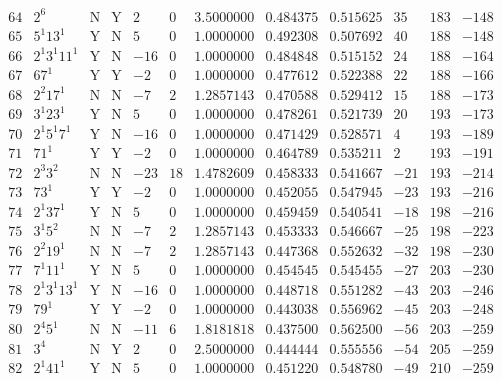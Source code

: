 \documentclass[11pt,reqno,a4letter]{article}
\numberwithin{figure}{section}
\numberwithin{table}{section}
\theoremstyle{plain}
\numberwithin{theorem}{section}
\theoremstyle{definition}
\begin{document}
\begin{table}[h!]
\begin{equation*}
{\begin{array}{cc|cc|ccc|cc|ccc}
 64 & 2^6 & \text{N} & \text{Y} & 2 & 0 & 3.5000000 & 0.484375 & 0.515625 & 35 & 183 & -148 \\
 65 & 5^1 13^1 & \text{Y} & \text{N} & 5 & 0 & 1.0000000 & 0.492308 & 0.507692 & 40 & 188 & -148 \\
 66 & 2^1 3^1 11^1 & \text{Y} & \text{N} & -16 & 0 & 1.0000000 & 0.484848 & 0.515152 & 24 & 188 & -164 \\
 67 & 67^1 & \text{Y} & \text{Y} & -2 & 0 & 1.0000000 & 0.477612 & 0.522388 & 22 & 188 & -166 \\
 68 & 2^2 17^1 & \text{N} & \text{N} & -7 & 2 & 1.2857143 & 0.470588 & 0.529412 & 15 & 188 & -173 \\
 69 & 3^1 23^1 & \text{Y} & \text{N} & 5 & 0 & 1.0000000 & 0.478261 & 0.521739 & 20 & 193 & -173 \\
 70 & 2^1 5^1 7^1 & \text{Y} & \text{N} & -16 & 0 & 1.0000000 & 0.471429 & 0.528571 & 4 & 193 & -189 \\
 71 & 71^1 & \text{Y} & \text{Y} & -2 & 0 & 1.0000000 & 0.464789 & 0.535211 & 2 & 193 & -191 \\
 72 & 2^3 3^2 & \text{N} & \text{N} & -23 & 18 & 1.4782609 & 0.458333 & 0.541667 & -21 & 193 & -214 \\
 73 & 73^1 & \text{Y} & \text{Y} & -2 & 0 & 1.0000000 & 0.452055 & 0.547945 & -23 & 193 & -216 \\
 74 & 2^1 37^1 & \text{Y} & \text{N} & 5 & 0 & 1.0000000 & 0.459459 & 0.540541 & -18 & 198 & -216 \\
 75 & 3^1 5^2 & \text{N} & \text{N} & -7 & 2 & 1.2857143 & 0.453333 & 0.546667 & -25 & 198 & -223 \\
 76 & 2^2 19^1 & \text{N} & \text{N} & -7 & 2 & 1.2857143 & 0.447368 & 0.552632 & -32 & 198 & -230 \\
 77 & 7^1 11^1 & \text{Y} & \text{N} & 5 & 0 & 1.0000000 & 0.454545 & 0.545455 & -27 & 203 & -230 \\
 78 & 2^1 3^1 13^1 & \text{Y} & \text{N} & -16 & 0 & 1.0000000 & 0.448718 & 0.551282 & -43 & 203 & -246 \\
 79 & 79^1 & \text{Y} & \text{Y} & -2 & 0 & 1.0000000 & 0.443038 & 0.556962 & -45 & 203 & -248 \\
 80 & 2^4 5^1 & \text{N} & \text{N} & -11 & 6 & 1.8181818 & 0.437500 & 0.562500 & -56 & 203 & -259 \\
 81 & 3^4 & \text{N} & \text{Y} & 2 & 0 & 2.5000000 & 0.444444 & 0.555556 & -54 & 205 & -259 \\
 82 & 2^1 41^1 & \text{Y} & \text{N} & 5 & 0 & 1.0000000 & 0.451220 & 0.548780 & -49 & 210 & -259 \\

\end{array}}
\end{equation*}
\end{table}
\end{document}
